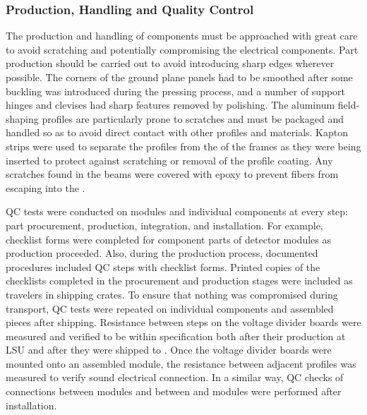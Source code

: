 


\subsubsection{Production, Handling and Quality Control}
\label{sec:fdsp-hv-protodune-lessons-prod}

The production and handling of  components must be approached with %
great care to avoid scratching and potentially compromising the electrical components. 
Part production should be carried out to avoid introducing sharp edges wherever possible.
The corners of the ground plane panels had to be smoothed after some buckling was introduced during the pressing process, and a number of support hinges and clevises had sharp features removed by polishing.
The aluminum field-shaping profiles are particularly prone to scratches and must be packaged and handled so as to avoid direct contact with other profiles and materials.
Kapton strips were used to separate the profiles from the  of the  frames as they were being inserted to protect against scratching or removal of the profile coating.
Any scratches found in the  beams were covered with epoxy to prevent fibers from escaping into the .

QC tests were conducted on  modules and individual components at every step: %
part procurement, production, integration, and installation.  For example, checklist forms were completed for component parts of detector modules as production proceeded.  Also, during the production process, documented procedures included QC steps with checklist forms.  Printed copies of the checklists completed in the procurement and production stages were included as travelers in shipping crates.  
To ensure that nothing was compromised during transport, QC tests were repeated on individual components and assembled pieces after shipping. 
Resistance between steps on the voltage divider boards were measured and verified to be within specification both after their production at LSU and after they were shipped to .
Once the voltage divider boards were mounted onto an assembled  module, the resistance between adjacent profiles was measured to verify sound electrical connection.
In a similar way, QC checks of connections between  modules and between  and  modules were performed after installation.

